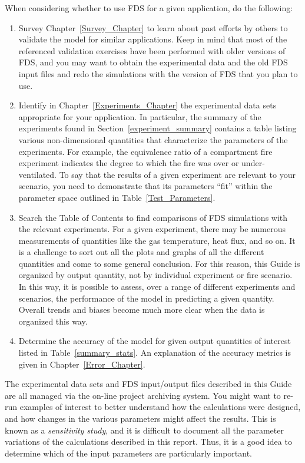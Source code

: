 When considering whether to use FDS for a given application, do the following:
\begin{enumerate}
\item Survey Chapter~\ref{Survey_Chapter} to learn about past efforts by others to validate the model for similar applications. Keep in mind that most of the referenced validation exercises have been performed with older versions of FDS, and you may want to obtain the experimental data and the old FDS input files and redo the simulations with the version of FDS that you plan to use.
\item Identify in Chapter~\ref{Experiments_Chapter} the experimental data sets appropriate for your application. In particular, the summary of the experiments found in Section~\ref{experiment_summary} contains a table listing various non-dimensional quantities that characterize the parameters of the experiments. For example, the equivalence ratio of a compartment fire experiment indicates the degree to which the fire was over or under-ventilated. To say that the results of a given experiment are relevant to your scenario, you need to demonstrate that its parameters ``fit'' within the parameter space outlined in Table~\ref{Test_Parameters}.
\item Search the Table of Contents to find comparisons of FDS simulations with the relevant experiments. For a given experiment, there may be numerous measurements of quantities like the gas temperature, heat flux, and so on. It is a challenge to sort out all the plots and graphs of all the different quantities and come to some general conclusion. For this reason, this Guide is organized by output quantity, not by individual experiment or fire scenario. In this way, it is possible to assess, over a range of different experiments and scenarios, the performance of the model in predicting a given quantity. Overall trends and biases become much more clear when the data is organized this way.
\item Determine the accuracy of the model for given output quantities of interest listed in Table~\ref{summary_stats}. An explanation of the accuracy metrics is given in Chapter~\ref{Error_Chapter}.
\end{enumerate}
The experimental data sets and FDS input/output files described in this Guide are all managed via the on-line project archiving system. You might want to re-run examples of interest to better understand how the calculations were designed, and how changes in the various parameters might affect the results. This is known as a {\em sensitivity study}, and it is difficult to document all the parameter variations of the calculations described in this report. Thus, it is a good idea to determine which of the input parameters are particularly important.
